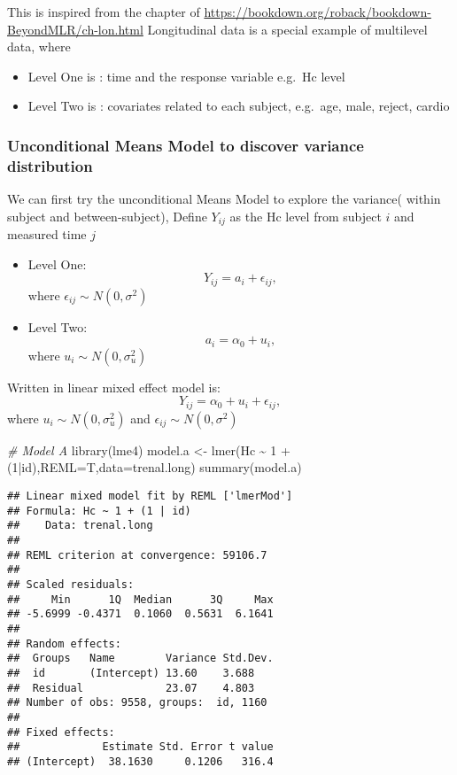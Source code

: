 \documentclass[
]{article}
\newenvironment{Shaded}{\begin{snugshade}}{\end{snugshade}}
\newcommand{\AttributeTok}[1]{\textcolor[rgb]{0.77,0.63,0.00}{#1}}
\newcommand{\CommentTok}[1]{\textcolor[rgb]{0.56,0.35,0.01}{\textit{#1}}}
\newcommand{\DecValTok}[1]{\textcolor[rgb]{0.00,0.00,0.81}{#1}}
\newcommand{\FunctionTok}[1]{\textcolor[rgb]{0.00,0.00,0.00}{#1}}
\newcommand{\NormalTok}[1]{#1}
\newcommand{\OtherTok}[1]{\textcolor[rgb]{0.56,0.35,0.01}{#1}}
\newcommand{\SpecialCharTok}[1]{\textcolor[rgb]{0.00,0.00,0.00}{#1}}
\providecommand{\tightlist}{%
  \setlength{\itemsep}{0pt}\setlength{\parskip}{0pt}}
\begin{document}
This is inspired from the chapter of
\url{https://bookdown.org/roback/bookdown-BeyondMLR/ch-lon.html}
Longitudinal data is a special example of multilevel data, where

\begin{itemize}
\tightlist
\item
  Level One is : time and the response variable e.g.~Hc level
\item
  Level Two is : covariates related to each subject, e.g.~age, male,
  reject, cardio
\end{itemize}

\hypertarget{unconditional-means-model-to-discover-variance-distribution}{%
\subsubsection{Unconditional Means Model to discover variance
distribution}\label{unconditional-means-model-to-discover-variance-distribution}}

We can first try the unconditional Means Model to explore the variance(
within subject and between-subject), Define \(Y_{ij}\) as the Hc level
from subject \(i\) and measured time \(j\)

\begin{itemize}
\tightlist
\item
  Level One: \[Y_{ij} = a_i + \epsilon_{ij},\] where
  \(\epsilon_{ij} \sim N(0,\sigma^2)\)
\item
  Level Two: \[a_i = \alpha_0 + u_i,\] where
  \(u_i \sim N(0,\sigma_{u}^2)\)
\end{itemize}

Written in linear mixed effect model is:
\[Y_{ij} = \alpha_0 + u_i + \epsilon_{ij},\] where
\(u_i \sim N(0,\sigma_u^2)\) and \(\epsilon_{ij} \sim N(0,\sigma^2)\)

\begin{Shaded}
\begin{Highlighting}[]
\CommentTok{\# Model A}
\FunctionTok{library}\NormalTok{(lme4)}
\NormalTok{model.a }\OtherTok{\textless{}{-}} \FunctionTok{lmer}\NormalTok{(Hc }\SpecialCharTok{\textasciitilde{}} \DecValTok{1} \SpecialCharTok{+}\NormalTok{ (}\DecValTok{1}\SpecialCharTok{|}\NormalTok{id),}\AttributeTok{REML=}\NormalTok{T,}\AttributeTok{data=}\NormalTok{trenal.long)}
\FunctionTok{summary}\NormalTok{(model.a)}
\end{Highlighting}
\end{Shaded}

\begin{verbatim}
## Linear mixed model fit by REML ['lmerMod']
## Formula: Hc ~ 1 + (1 | id)
##    Data: trenal.long
## 
## REML criterion at convergence: 59106.7
## 
## Scaled residuals: 
##     Min      1Q  Median      3Q     Max 
## -5.6999 -0.4371  0.1060  0.5631  6.1641 
## 
## Random effects:
##  Groups   Name        Variance Std.Dev.
##  id       (Intercept) 13.60    3.688   
##  Residual             23.07    4.803   
## Number of obs: 9558, groups:  id, 1160
## 
## Fixed effects:
##             Estimate Std. Error t value
## (Intercept)  38.1630     0.1206   316.4
\end{verbatim}
\end{document}
